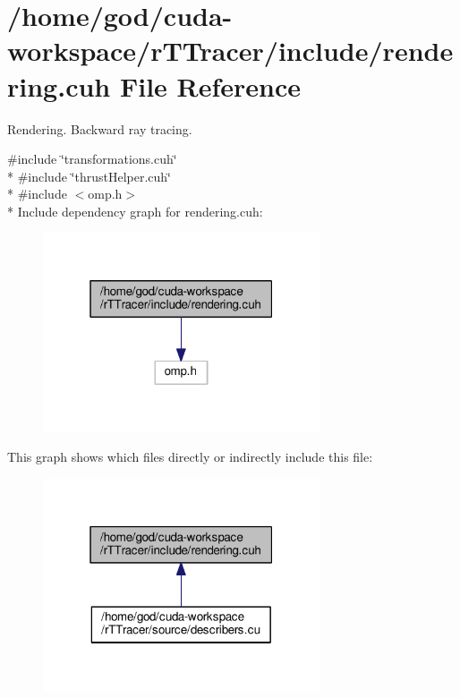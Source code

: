 \hypertarget{rendering_8cuh}{}\section{/home/god/cuda-\/workspace/r\+T\+Tracer/include/rendering.cuh File Reference}
\label{rendering_8cuh}


Rendering. Backward ray tracing.  


{\ttfamily \#include \char`\"{}transformations.\+cuh\char`\"{}}\\*
{\ttfamily \#include \char`\"{}thrust\+Helper.\+cuh\char`\"{}}\\*
{\ttfamily \#include $<$omp.\+h$>$}\\*
Include dependency graph for rendering.\+cuh\+:
\nopagebreak
\begin{figure}[H]
\begin{center}
\leavevmode
\includegraphics[width=232pt]{rendering_8cuh__incl}
\end{center}
\end{figure}
This graph shows which files directly or indirectly include this file\+:
\nopagebreak
\begin{figure}[H]
\begin{center}
\leavevmode
\includegraphics[width=232pt]{rendering_8cuh__dep__incl}
\end{center}
\end{figure}
